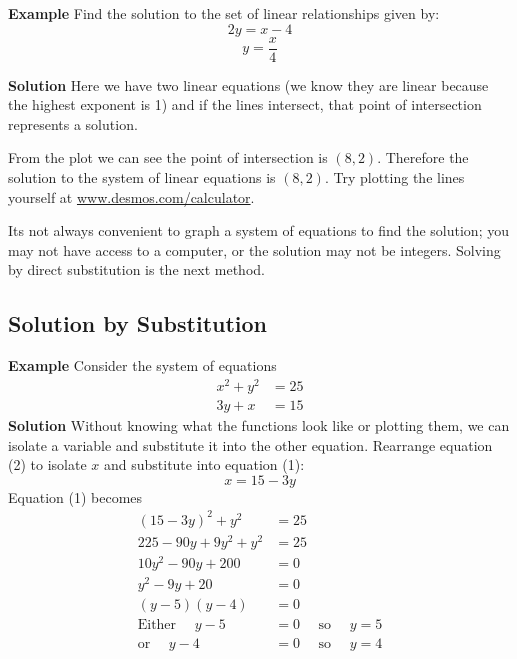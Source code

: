  \textbf{Example} Find the solution to the set of linear relationships given by:
 $$2y=x-4$$
 $$y=\frac{x}{4}$$
  \begin{multicols}{2}
 \textbf{Solution} Here we have two linear equations (we know they are linear because the highest exponent is 1) and if the lines intersect, that point of intersection represents a solution. 
 	
 	From the plot we can see the point of intersection is $(8,2)$. Therefore the solution to the system of linear equations is $(8,2)$. Try plotting the lines yourself at \url{www.desmos.com/calculator}.
 	
 	
 	Its not always convenient to graph a system of equations to find the solution; you may not have access to a computer, or the solution may not be integers. Solving by direct substitution is the next method.
 	\columnbreak
 \begin{center}
\end{center}
\end{multicols}
 \subsection*{Solution by Substitution}
 \textbf{Example} Consider the system of equations
 \begin{align}x^{2} +y^{2} &  = 25 \tag{1} \\
 3 y +x &  = 15 \tag{2}\end{align}
 \textbf{Solution} Without knowing what the functions look like or plotting them, we can isolate a variable and substitute it into the other equation. Rearrange equation (2) to isolate $x$ and substitute into equation (1):
$$x =  15 -3 y $$
 Equation (1) becomes
 \begin{align*}(15-3y)^2+y^2 &  =  25 \tag{expand and simplify}\\
 225-90y+9y^2+y^2&=25\\
 10 y^{2} -90 y +200 &  =  0 \tag{divide by 10}\\
 y^{2} -9 y +20 &  = 0 \tag{factor the quadratic}\\
 \left (y -5\right ) \left (y -4\right ) &  =  0 \\
 \text{Either }\quad y -5 &  =  0\quad\text{ so }\quad y =5 \\
 \text{or }\quad y -4 &  =  0\quad\text{ so }\quad y =4\end{align*}
 
